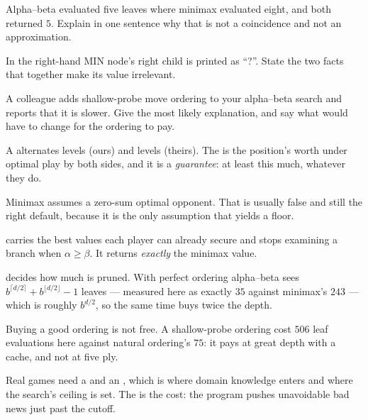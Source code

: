\begin{checkpoint}
\begin{tightnum}
  \item Alpha--beta evaluated five leaves where minimax evaluated eight, and both
        returned $5$. Explain in one sentence why that is not a coincidence and not
        an approximation.
  \item In  the right-hand MIN node's right child is printed as
        ``?''. State the two facts that together make its value irrelevant.
  \item A colleague adds shallow-probe move ordering to your alpha--beta search and
        reports that it is slower. Give the most likely explanation, and say what
        would have to change for the ordering to pay.
\end{tightnum}
\end{checkpoint}

\begin{chaptersummary}
\begin{tight}
  \item A  alternates  levels (ours) and 
        levels (theirs). The  is the position's worth under
        optimal play by both sides, and it is a \emph{guarantee}: at least this
        much, whatever they do.
  \item Minimax assumes a zero-sum optimal opponent. That is usually false and
        still the right default, because it is the only assumption that yields a
        floor.
  \item {} carries the best values each player can already
        secure and stops examining a branch when $\alpha \ge \beta$. It returns
        \emph{exactly} the minimax value.
  \item {} decides how much is pruned. With perfect ordering
        alpha--beta sees $b^{\lceil d/2\rceil} + b^{\lfloor d/2\rfloor} - 1$
        leaves --- measured here as exactly $35$ against minimax's $243$ ---
        which is roughly $b^{d/2}$, so the same time buys twice the depth.
  \item Buying a good ordering is not free. A shallow-probe ordering cost $506$
        leaf evaluations here against natural ordering's $75$: it pays at great
        depth with a cache, and not at five ply.
  \item Real games need a  and an ,
        which is where domain knowledge enters and where the search's ceiling is
        set. The  is the cost: the program pushes
        unavoidable bad news just past the cutoff.
\end{tight}
\end{chaptersummary}

